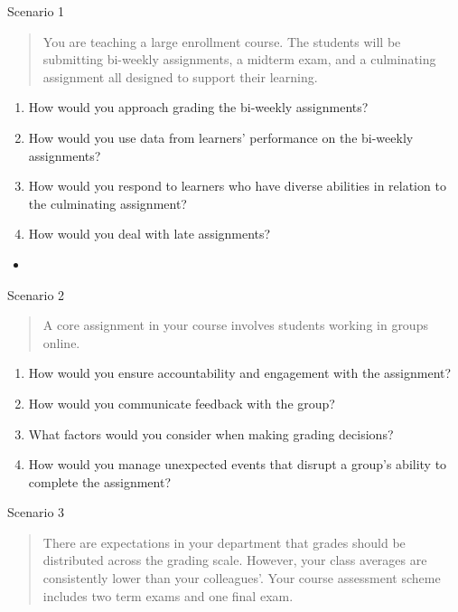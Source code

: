 \documentclass[
]{book}
\providecommand{\tightlist}{%
  \setlength{\itemsep}{0pt}\setlength{\parskip}{0pt}}
\begin{document}
Scenario 1

\begin{quote}
You are teaching a large enrollment course. The students will be submitting bi-weekly assignments, a midterm exam, and a culminating assignment all designed to support their learning.
\end{quote}

\begin{enumerate}
\def\labelenumi{\arabic{enumi}.}
\tightlist
\item
  How would you approach grading the bi-weekly assignments?\\
\item
  How would you use data from learners' performance on the bi-weekly assignments?\\
\item
  How would you respond to learners who have diverse abilities in relation to the culminating assignment?\\
\item
  How would you deal with late assignments?
\end{enumerate}

\begin{itemize}
\item
\end{itemize}

Scenario 2

\begin{quote}
A core assignment in your course involves students working in groups online.
\end{quote}

\begin{enumerate}
\def\labelenumi{\arabic{enumi}.}
\tightlist
\item
  How would you ensure accountability and engagement with the assignment?
\item
  How would you communicate feedback with the group?
\item
  What factors would you consider when making grading decisions?
\item
  How would you manage unexpected events that disrupt a group's ability to complete the assignment?
\end{enumerate}

Scenario 3

\begin{quote}
There are expectations in your department that grades should be distributed across the grading scale. However, your class averages are consistently lower than your colleagues'. Your course assessment scheme includes two term exams and one final exam.
\end{quote}
\end{document}
